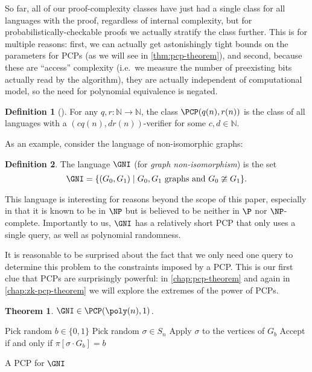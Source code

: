 \documentclass[english,12pt]{reedthesis}
\theoremstyle{plain}
\newtheorem{thm}{Theorem}[section]
\theoremstyle{definition}
\newtheorem{defn}[defn]{Definition}
\theoremstyle{remark}
\begin{document}
So far, all of our proof-complexity classes have just had a single class for all
languages with the proof, regardless of internal complexity, but for
probabilistically-checkable proofs we actually stratify the class further. This
is for multiple reasons: first, we can actually get astonishingly tight bounds
on the parameters for PCPs (as we will see in \cref{thm:pcp-theorem}), and
second, because these are ``access'' complexity (i.e.\ we measure the number of
preexisting bits actually read by the algorithm), they are actually independent
of computational model, so the need for polynomial equivalence is negated.

\begin{defn}[{\cite[Def.\ 18.1]{AB09}}]\label{def:pcp}
  For any $q, r\colon \mathbb{N} \rightarrow \mathbb{N}$, the class $\PCP(q(n), r(n))$ is the class of all
  languages with a $(cq(n), dr(n))$-verifier for some $c, d \in \mathbb{N}$.
\end{defn}

As an example, consider the language of non-isomorphic graphs:

\begin{defn}\label{def:gni}
  The language $\GNI$ (for \emph{graph non-isomorphism}) is the set
  \[
    \GNI = \{(G_{0}, G_{1}) \mid G_{0}, G_{1} \text{ graphs and } G_{0} \ncong G_{1}\}.
  \]
\end{defn}

This language is interesting for reasons beyond the scope of this paper,
especially in that it is known to be in $\NP$ but is believed to be neither in
$\P$ nor $\NP$-complete. Importantly to us, $\GNI$ has a relatively short PCP
that only uses a single query, as well as polynomial randomness.

It is reasonable to be surprised about the fact that we only need one query to
determine this problem to the constraints imposed by a PCP. This is our first
clue that PCPs are surprisingly powerful: in \cref{chap:pcp-theorem} and again
in \cref{chap:zk-pcp-theorem} we will explore the extremes of the power of PCPs.

\begin{thm}\label{thm:gni-pcp}
  $\GNI \in \PCP(\poly(n), 1)$.
\end{thm}

\begin{algorithm}[htbp]
  \KwRet{$\pi$}\;
  Pick random $b \in \{0, 1\}$\;
  Pick random $\sigma \in S_{n}$\;
  Apply $\sigma$ to the vertices of $G_{b}$\;
  Accept if and only if $\pi[\sigma \cdot G_{b}] = b$\;
  \caption{A PCP for $\GNI$}\label{alg:gni-pcp}
\end{algorithm}
\end{document}
